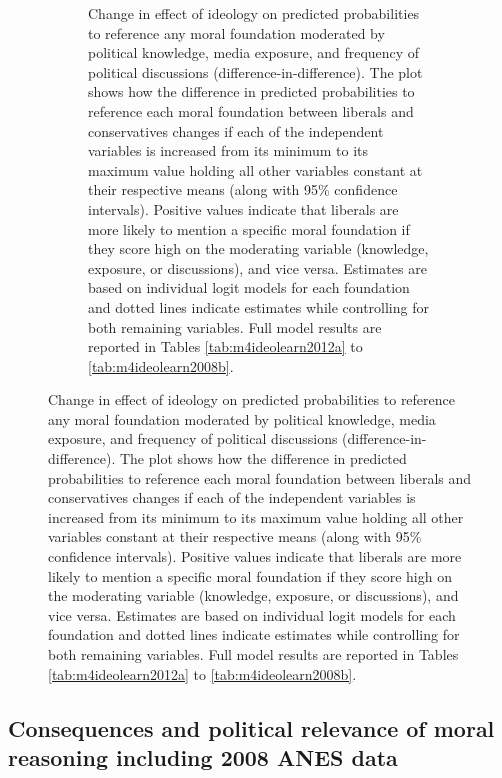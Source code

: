 \documentclass[12pt]{article}
\begin{document}
\begin{figure}[h]
\begin{subfigure}[t]{0.49\textwidth}
    \caption{Change in effect of ideology on predicted probabilities to reference any moral foundation moderated by political knowledge, media exposure, and frequency of political discussions (difference-in-difference). The plot shows how the difference in predicted probabilities to reference each moral foundation between liberals and conservatives changes if each of the independent variables is increased from its minimum to its maximum value holding all other variables constant at their respective means (along with 95\% confidence intervals). Positive values indicate that liberals are more likely to mention a specific moral foundation if they score high on the moderating variable (knowledge, exposure, or discussions), and vice versa. Estimates are based on individual logit models for each foundation and dotted lines indicate estimates while controlling for both remaining variables. Full model results are reported in Tables \ref{tab:m4ideolearn2012a} to \ref{tab:m4ideolearn2008b}.}\label{fig:appD8ideolearn}
  \end{subfigure}
\end{figure}


\clearpage
\subsection{Consequences and political relevance of moral reasoning including 2008 ANES data}
\end{document}
